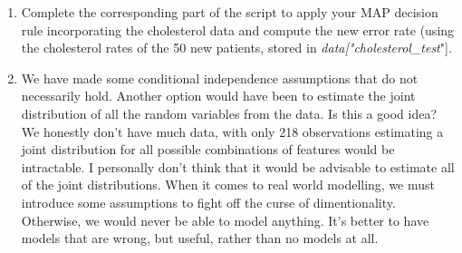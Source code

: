 \documentclass[12pt,twoside]{article}
\begin{document}
\begin{enumerate}
\begin{enumerate}
\item Complete the corresponding part of the script to apply your MAP decision rule incorporating the cholesterol data and compute the new error rate (using the cholesterol rates of the 50 new patients, stored in \emph{data["cholesterol\_test}"]. %
\item We have made some conditional independence assumptions that do not necessarily hold. Another option would have been to estimate the joint distribution of all the random variables from the data. Is this a good idea? %
\subitem
We honestly don't have much data, with only 218 observations estimating a joint distribution for all possible combinations of features would be intractable. I personally don't think that it would be advisable to estimate all of the joint distributions. When it comes to real world modelling, we must introduce some assumptions to fight off the curse of dimentionality. Otherwise, we would never be able to model anything. It's better to have models that are wrong, but useful, rather than no models at all. 
\end{enumerate}

\end{enumerate}
\end{document}

